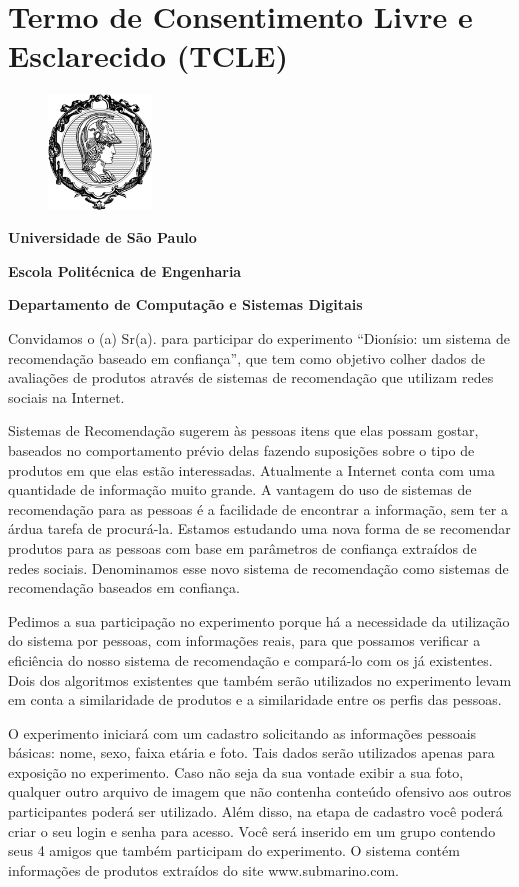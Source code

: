 \chapter {Termo de Consentimento Livre e Esclarecido (TCLE)}
\label{cha:TCLE}

\begin{figure}[ht]
  \centering
  \includegraphics[width=2.76cm]{imagens/minerva.png}
\end{figure}
\centerline{\textbf{Universidade de São Paulo}}
\centerline{\textbf{Escola Politécnica de Engenharia}}
\centerline{\textbf{Departamento de Computação e Sistemas Digitais}}
\vspace{0.3in}
 Convidamos o (a) Sr(a). para participar do experimento ``Dionísio: um sistema de recomendação baseado em confiança'', que tem como objetivo colher dados de avaliações de produtos através de sistemas de recomendação que utilizam redes sociais na Internet.

 Sistemas de Recomendação sugerem às pessoas itens que elas possam gostar, baseados no comportamento prévio delas fazendo suposições sobre o tipo de produtos em que elas estão interessadas. Atualmente a Internet conta com uma quantidade de informação muito grande. A vantagem do uso de sistemas de recomendação para as pessoas é a facilidade de encontrar a informação, sem ter a árdua tarefa de procurá-la. Estamos estudando uma nova forma de se recomendar produtos para as pessoas com base em parâmetros de confiança extraídos de redes sociais. Denominamos esse novo sistema de recomendação como sistemas de recomendação baseados em confiança.
	
 Pedimos a sua participação no experimento porque há a necessidade da utilização do sistema por pessoas, com informações reais, para que possamos verificar a eficiência do nosso sistema de recomendação e compará-lo com os já existentes. Dois dos algoritmos existentes que também serão utilizados no experimento levam em conta a similaridade de produtos e a similaridade entre os perfis das pessoas.

 O experimento iniciará com um cadastro solicitando as informações pessoais básicas: nome, sexo, faixa etária e foto. Tais dados serão utilizados apenas para exposição no experimento. Caso não seja da sua vontade exibir a sua foto, qualquer outro arquivo de imagem que não contenha conteúdo ofensivo aos outros participantes poderá ser utilizado. Além disso, na etapa de cadastro você poderá criar o seu login e senha para acesso. Você será inserido em um grupo contendo seus 4 amigos que também participam do experimento. O sistema contém informações de produtos extraídos do site www.submarino.com.

